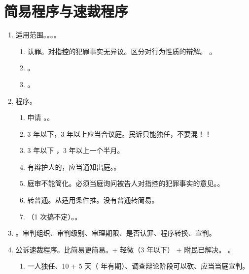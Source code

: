 \section{简易程序与速裁程序}
\begin{enumerate}
  \item 适用范围。。。。
        \begin{enumerate}
          \item 认罪。对指控的犯罪事实无异议。区分对行为性质的辩解。
                。
          \item {}。
          \item {}。
        \end{enumerate}
  \item 程序。
        \begin{enumerate}
          \item 申请 \hz {}。。
          \item 3 年以下，3 年以上应当合议庭。民诉只能独任，不要混！！
          \item 3 年以下 ，3 年以上一个半月。
          \item 有辩护人的，应当通知出庭。。
          \item 庭审不能简化。必须当庭询问被告人对指控的犯罪事实的意见。。
          \item 转普通。从适用条件推。没有普通转简易。
          \item {}（1 次搞不定）。。
        \end{enumerate}
  \item {}。审判组织、审判级别、审理期限、是否认罪、程序转换、宣判。
  \item 公诉速裁程序。比简易更简易。+ 轻微（3 年以下） + 附民已解决。
        。
        \begin{enumerate}
          \item 一人独任、10 + 5 天（ 年有期）、调查辩论阶段可以砍、应当当庭宣判。
                \begin{enumerate}

\end{enumerate}
\end{enumerate}
\end{enumerate}
